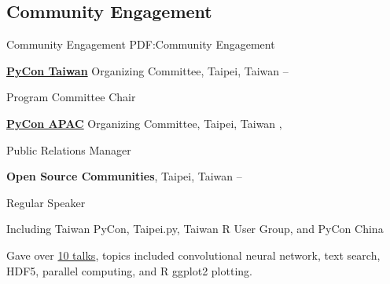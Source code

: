 \documentclass[a4paper,12pt,oneside]{article}
\begin{document}
\begin{body}
%


\section{Community Engagement}
{Community Engagement}
{PDF:Community Engagement}

\href{http://pycon.tw}{\textbf{PyCon Taiwan}} Organizing Committee, Taipei, Taiwan
\hfill
{} --
\par
Program Committee Chair

\EntryGapNoBreak
\href{http://pycon.tw}{\textbf{PyCon APAC}} Organizing Committee, Taipei, Taiwan
\hfill
{},
\par
Public Relations Manager

\BigEntryGapNoBreak
\textbf{Open Source Communities}, Taipei, Taiwan
\hfill
{} --
\par
Regular Speaker
\begin{detail}
    \begin{detailitem}
    \item Including Taiwan PyCon, Taipei.py, Taiwan R User Group, and PyCon China
    \item Gave over \href{http://blog.liang2.tw/talks/#talks}{10 talks}, topics included
        convolutional neural network, text search,
        HDF5, parallel computing, and R ggplot2 plotting.
    \end{detailitem}
\end{detail}


\end{body}
\end{document}

